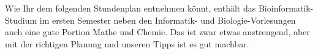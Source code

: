 Wie Ihr dem folgenden Stundenplan entnehmen könnt, enthält das Bioinformatik-Studium im ersten
Semester neben den Informatik- und Biologie-Vorlesungen auch eine gute Portion Mathe und Chemie.
Das ist zwar etwas anstrengend, aber mit der richtigen Planung und unseren Tipps ist es gut
machbar.


\begin{center}



\end{center}
